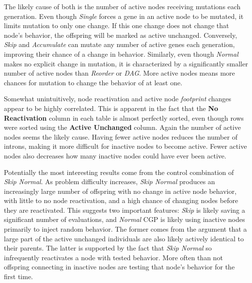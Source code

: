 \documentclass[journal]{IEEEtran}
\begin{document}
The likely cause of both is the number
of active nodes receiving mutations each generation.  Even though \emph{Single}
forces a gene in an active node to be mutated, it limits mutation to only one change.
If this one change does not change that node's behavior, the offspring will be marked
as active unchanged.  Conversely, \emph{Skip} and \emph{Accumulate} can mutate any
number of active genes each generation, improving their chance of a change in behavior.
Similarly, even though \emph{Normal} makes no explicit change in mutation, it is characterized
by a significantly smaller number of active nodes than \emph{Reorder} or \emph{DAG}.  More
active nodes means more chances for mutation to change the behavior of at least one.

Somewhat unintuitively, node reactivation and active node \emph{footprint} changes appear
to be highly correlated.  This is apparent in the fact that the \textbf{No Reactivation}
column in each table is almost perfectly sorted, even though rows were sorted using the
\textbf{Active Unchanged} column.  Again the number of active nodes seems the likely
cause.  Having fewer active nodes reduces the number of introns, making it more
difficult for inactive nodes to become active.  Fewer active nodes also decreases
how many inactive nodes could have ever been active.

Potentially the most interesting results come from the control combination of
\emph{Skip Normal}.  As problem difficulty increases, \emph{Skip Normal} produces
an increasingly large number of offspring with no change in active node behavior,
with little to no node reactivation, and a high chance of changing nodes before
they are reactivated.  This suggests two important features: \emph{Skip} is likely
saving a significant number of evaluations, and \emph{Normal} CGP is likely using
inactive nodes primarily to inject random behavior.  The former comes from the
argument that a large part of the active unchanged individuals are also likely
actively identical to their parents.  The latter is supported by the fact that
\emph{Skip Normal} so infrequently reactivates a node with tested behavior.  More
often than not offspring connecting in inactive nodes are testing that node's behavior
for the first time.
\end{document}
